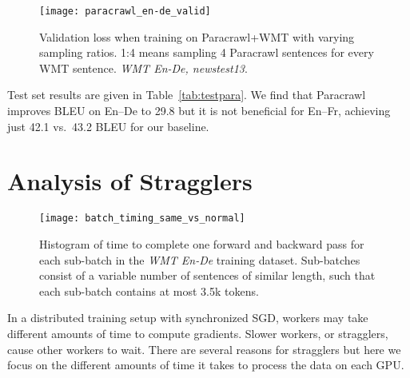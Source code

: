 \documentclass[11pt,a4paper]{article}
\begin{document}
\begin{figure}[t]
\centering
\texttt{[image: paracrawl\_en-de\_valid]}
\caption{Validation loss when training on Paracrawl+WMT with varying sampling ratios.
1:4 means sampling 4 Paracrawl sentences for every WMT sentence.
\emph{WMT En-De, newstest13}.}
\label{fig:paracrawl}
\end{figure}

Test set results are given in Table~\ref{tab:testpara}.
We find that Paracrawl improves BLEU on En--De to 29.8 but it is not beneficial for En--Fr, achieving just 42.1 vs.~43.2 BLEU for our baseline.

\section{Analysis of Stragglers}\label{sec:analysis}

\begin{figure}[t]
\begin{center}
\texttt{[image: batch\_timing\_same\_vs\_normal]}
\end{center}
\caption{
Histogram of time to complete one forward and backward pass for each sub-batch in the \emph{WMT En-De} training dataset.
Sub-batches consist of a variable number of sentences of similar length, such that each sub-batch contains at most 3.5k tokens.
}
\label{fig:batch_timing_same_vs_normal}
\end{figure}



In a distributed training setup with synchronized SGD, workers may take different amounts of time to compute gradients. 
Slower workers, or stragglers, cause other workers to wait. 
There are several reasons for stragglers but here we focus on the different amounts of time it takes to process the data on each GPU.
\end{document}
